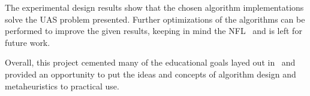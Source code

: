 \documentclass[conference]{IEEEtran}
\begin{document}
The experimental design results show that the chosen algorithm implementations
solve the UAS problem presented. Further optimizations of the algorithms can be
performed to improve the given results, keeping in mind the
NFL~\cite{collet2007, wiki:nfl, igel2014} and is left for future work.

Overall, this project cemented many of the educational goals layed out
in~\cite{lamontSyllabus} and provided an opportunity to put the ideas and
concepts of algorithm design and metaheuristics to practical use.



\newpage
{}

\end{document}
